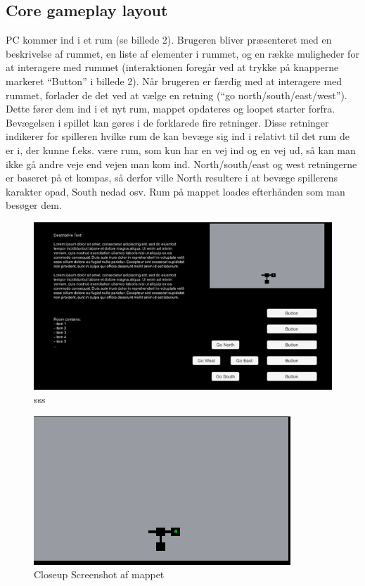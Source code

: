 \subsection{Core gameplay layout}
PC kommer ind i et rum (se billede 2).  Brugeren bliver præsenteret med en beskrivelse af rummet, en liste af elementer i rummet, og en række muligheder for at interagere med rummet (interaktionen foregår ved at trykke på knapperne markeret “Button” i billede 2). Når brugeren er færdig med at interagere med rummet, forlader de det ved at vælge en retning (“go north/south/east/west”). 
Dette fører dem ind i et nyt rum, mappet opdateres og loopet starter forfra.
Bevægelsen i spillet kan gøres i de forklarede fire retninger. Disse retninger indikerer for spilleren hvilke rum de kan bevæge sig ind i relativt til det rum de er i, der kunne f.eks. være rum, som kun har en vej ind og en vej ud, så kan man ikke gå andre veje end vejen man kom ind. North/south/east og west retningerne er baseret på et kompas, så derfor ville North resultere i at bevæge spillerens karakter opad, South nedad osv.
Rum på mappet loades efterhånden som man besøger dem.

\begin{figure}[H]
\centering
\includegraphics[width = \textwidth]{02-Body/Images/SpilLayout-udkast.png}
\caption{sss}
\label{fig:Spillayout-udkast}
\end{figure}

\begin{figure}[H]
\centering
\includegraphics[width = \textwidth]{02-Body/Images/Map-closeup.png}
\caption{Closeup Screenshot af mappet}
\label{fig:Spillayout-udkast}
\end{figure}

